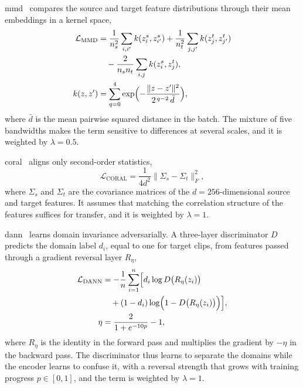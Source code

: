 \documentclass[Royal,sagev,times]{sagej}
\begin{document}
\ac{mmd}~\cite{long2015dan} compares the source and target feature
distributions through their mean embeddings in a kernel space,
\begin{equation}
  \begin{aligned}
  \mathcal{L}_{\mathrm{MMD}}
    &=\frac{1}{n_s^2}\sum_{i,i'}k(z_i^s,z_{i'}^s)
      +\frac{1}{n_t^2}\sum_{j,j'}k(z_j^t,z_{j'}^t)\\
    &\quad-\frac{2}{n_sn_t}\sum_{i,j}k(z_i^s,z_j^t),\\
  k(z,z')&=\sum_{q=0}^{4}\exp\Bigl(-\frac{\|z-z'\|^2}
      {2^{\,q-2}\,\bar{d}}\Bigr),
  \end{aligned}
  \label{eq:mmd}
\end{equation}
where $\bar{d}$ is the mean pairwise squared distance in the batch. The mixture
of five bandwidths makes the term sensitive to differences at several scales,
and it is weighted by $\lambda=0.5$.

\ac{coral}~\cite{sun2016deepcoral} aligns only second-order statistics,
\begin{equation}
  \mathcal{L}_{\mathrm{CORAL}}=\frac{1}{4d^2}\bigl\|\Sigma_s-\Sigma_t\bigr\|_F^2,
  \label{eq:coral}
\end{equation}
where $\Sigma_s$ and $\Sigma_t$ are the covariance matrices of the
$d=256$-dimensional source and target features. It assumes that matching the
correlation structure of the features suffices for transfer, and it is weighted
by $\lambda=1$.

\ac{dann}~\cite{ganin2016dann} learns domain invariance adversarially. A
three-layer discriminator $D$ predicts the domain label $d_i$, equal to one for
target clips, from features passed through a gradient reversal layer
$R_\eta$,
\begin{equation}
  \begin{aligned}
  \mathcal{L}_{\mathrm{DANN}}
    &=-\frac{1}{n}\sum_{i=1}^{n}
      \Bigl[d_i\log D\bigl(R_\eta(z_i)\bigr)\\
    &\quad +(1-d_i)\log\Bigl(1-D\bigl(R_\eta(z_i)\bigr)\Bigr)\Bigr],\\
  \eta&=\frac{2}{1+e^{-10p}}-1,
  \end{aligned}
  \label{eq:dann}
\end{equation}
where $R_\eta$ is the identity in the forward pass and multiplies the gradient
by $-\eta$ in the backward pass. The discriminator thus learns to separate the
domains while the encoder learns to confuse it, with a reversal strength that
grows with training progress $p\in[0,1]$, and the term is weighted by
$\lambda=1$.
\end{document}
